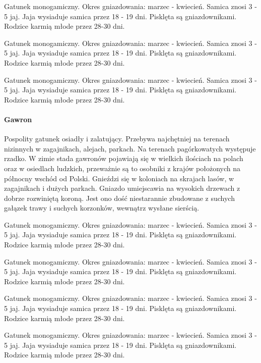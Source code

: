 \documentclass[a4paper,12pt,twoside]{article}
\begin{document}
\medskip

\begin{minipage}[t][6cm][t]{45mm}
Gatunek monogamiczny. Okres gniazdowania: marzec - kwiecień. Samica znosi 3 - 5 jaj. Jaja wysiaduje samica przez 18 - 19 dni. Pisklęta są gniazdownikami. Rodzice karmią młode przez 28-30 dni.  
\end{minipage}
%
\hspace{5mm}
%
\begin{minipage}[t][6cm][c]{45mm}
Gatunek monogamiczny. Okres gniazdowania: marzec - kwiecień. Samica znosi 3 - 5 jaj. Jaja wysiaduje samica przez 18 - 19 dni. Pisklęta są gniazdownikami. Rodzice karmią młode przez 28-30 dni. 
\end{minipage}
%
\hspace{5mm}
%
\begin{minipage}[t][6cm][b]{45mm}
Gatunek monogamiczny. Okres gniazdowania: marzec - kwiecień. Samica znosi 3 - 5 jaj. Jaja wysiaduje samica przez 18 - 19 dni. Pisklęta są gniazdownikami. Rodzice karmią młode przez 28-30 dni.  
\end{minipage}

\newpage

\paragraph{Gawron} Pospolity gatunek osiadły i zalatujący. Przebywa najchętniej na terenach nizinnych w zagajnikach, alejach, parkach. Na terenach pagórkowatych występuje rzadko. W zimie stada gawronów pojawiają się w wielkich ilościach na polach oraz w osiedlach ludzkich, przeważnie są to osobniki z krajów położonych na północny wschód od Polski. Gnieździ się w koloniach na skrajach lasów, w zagajnikach i dużych parkach. Gniazdo umiejscawia na wysokich drzewach z dobrze rozwiniętą koroną. Jest ono dość niestarannie zbudowane z suchych gałązek trawy i suchych korzonków, wewnątrz wysłane sierścią.

\medskip

\begin{minipage}[t][7cm][c]{45mm}
Gatunek monogamiczny. Okres gniazdowania: marzec - kwiecień. Samica znosi 3 - 5 jaj. Jaja wysiaduje samica przez 18 - 19 dni. Pisklęta są gniazdownikami. Rodzice karmią młode przez 28-30 dni.  
\end{minipage}
%
\hspace{5mm}
%
\begin{minipage}[c][7cm][c]{45mm}
Gatunek monogamiczny. Okres gniazdowania: marzec - kwiecień. Samica znosi 3 - 5 jaj. Jaja wysiaduje samica przez 18 - 19 dni. Pisklęta są gniazdownikami. Rodzice karmią młode przez 28-30 dni. 
\end{minipage}
%
\hspace{5mm}
%
\begin{minipage}[b][7cm][c]{45mm}
Gatunek monogamiczny. Okres gniazdowania: marzec - kwiecień. Samica znosi 3 - 5 jaj. Jaja wysiaduje samica przez 18 - 19 dni. Pisklęta są gniazdownikami. Rodzice karmią młode przez 28-30 dni.  
\end{minipage}

\newpage


\hfill
\begin{minipage}[t][\textheight][b]{45mm}
Gatunek monogamiczny. Okres gniazdowania: marzec - kwiecień. Samica znosi 3 - 5 jaj. Jaja wysiaduje samica przez 18 - 19 dni. Pisklęta są gniazdownikami. Rodzice karmią młode przez 28-30 dni.  
\end{minipage}
\end{document}
